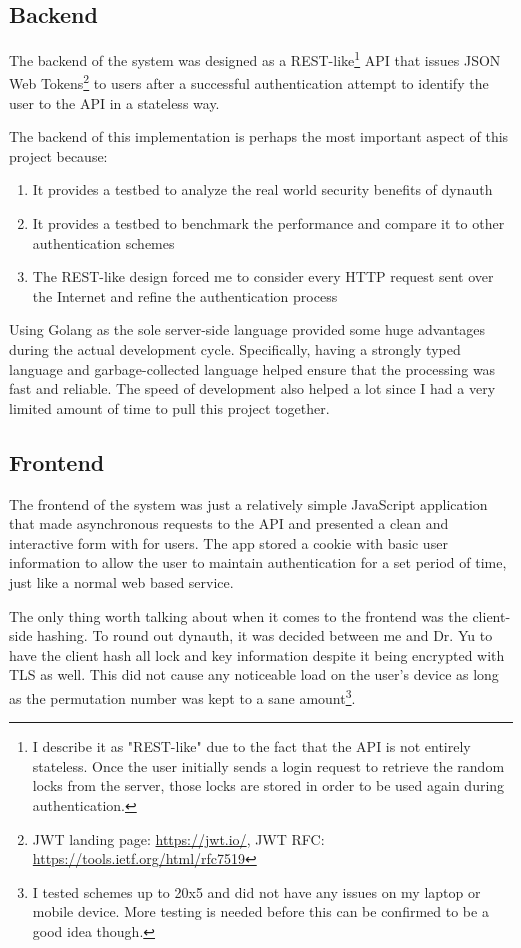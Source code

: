 \documentclass[conference]{IEEEtran}
\begin{document}
\subsection{Backend}
	The backend of the system was designed as a REST-like\footnote{I describe it as "REST-like" due to the fact that the API is not entirely stateless. Once the user initially sends a login request to retrieve the random locks from the server, those locks are stored in order to be used again during authentication.} API that issues JSON Web Tokens\footnote{JWT landing page: \url{https://jwt.io/}, JWT RFC: \url{https://tools.ietf.org/html/rfc7519}} to users after a successful authentication attempt to identify the user to the API in a stateless way.
	
	The backend of this implementation is perhaps the most important aspect of this project because:
	\begin{enumerate}
		\item It provides a testbed to analyze the real world security benefits of dynauth
		\item It provides a testbed to benchmark the performance and compare it to other authentication schemes
		\item The REST-like design forced me to consider every HTTP request sent over the Internet and refine the authentication process
	\end{enumerate}
	Using Golang as the sole server-side language provided some huge advantages during the actual development cycle. Specifically, having a strongly typed language and garbage-collected language helped ensure that the processing was fast and reliable. The speed of development also helped a lot since I had a very limited amount of time to pull this project together.
\subsection{Frontend}
	The frontend of the system was just a relatively simple JavaScript application that made asynchronous requests to the API and presented a clean and interactive form with for users. The app stored a cookie with basic user information to allow the user to maintain authentication for a set period of time, just like a normal web based service.
	
	The only thing worth talking about when it comes to the frontend was the client-side hashing. To round out dynauth, it was decided between me and Dr. Yu to have the client hash all lock and key information despite it being encrypted with TLS as well. This did not cause any noticeable load on the user's device as long as the permutation number was kept to a sane amount\footnote{I tested schemes up to 20x5 and did not have any issues on my laptop or mobile device. More testing is needed before this can be confirmed to be a good idea though.}.
\end{document}
